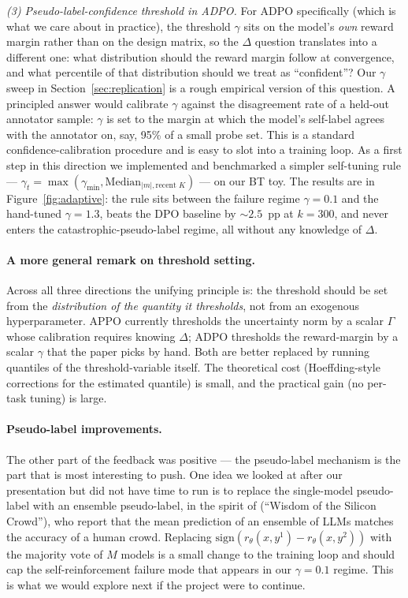\documentclass[11pt]{article}
\begin{document}
\emph{(3) Pseudo-label-confidence threshold in ADPO.} For ADPO specifically (which is what we care about in practice), the threshold $\gamma$ sits on the model's \emph{own} reward margin rather than on the design matrix, so the $\Delta$ question translates into a different one: what distribution should the reward margin follow at convergence, and what percentile of that distribution should we treat as ``confident''? Our $\gamma$ sweep in Section~\ref{sec:replication} is a rough empirical version of this question. A principled answer would calibrate $\gamma$ against the disagreement rate of a held-out annotator sample: $\gamma$ is set to the margin at which the model's self-label agrees with the annotator on, say, 95\% of a small probe set. This is a standard confidence-calibration procedure and is easy to slot into a training loop. As a first step in this direction we implemented and benchmarked a simpler self-tuning rule --- $\gamma_t = \max(\gamma_{\min}, \mathrm{Median}_{|m|, \text{recent } K})$ --- on our BT toy. The results are in Figure~\ref{fig:adaptive}: the rule sits between the failure regime $\gamma = 0.1$ and the hand-tuned $\gamma = 1.3$, beats the DPO baseline by $\sim 2.5$~pp at $k = 300$, and never enters the catastrophic-pseudo-label regime, all without any knowledge of $\Delta$.

\paragraph{A more general remark on threshold setting.}
Across all three directions the unifying principle is: the threshold should be set from the \emph{distribution of the quantity it thresholds}, not from an exogenous hyperparameter. APPO currently thresholds the uncertainty norm by a scalar $\Gamma$ whose calibration requires knowing $\Delta$; ADPO thresholds the reward-margin by a scalar $\gamma$ that the paper picks by hand. Both are better replaced by running quantiles of the threshold-variable itself. The theoretical cost (Hoeffding-style corrections for the estimated quantile) is small, and the practical gain (no per-task tuning) is large.

\paragraph{Pseudo-label improvements.}
The other part of the feedback was positive --- the pseudo-label mechanism is the part that is most interesting to push. One idea we looked at after our presentation but did not have time to run is to replace the single-model pseudo-label with an ensemble pseudo-label, in the spirit of \cite{schoenegger} (``Wisdom of the Silicon Crowd''), who report that the mean prediction of an ensemble of LLMs matches the accuracy of a human crowd. Replacing $\mathrm{sign}(r_\theta(x, y^1) - r_\theta(x, y^2))$ with the majority vote of $M$ models is a small change to the training loop and should cap the self-reinforcement failure mode that appears in our $\gamma = 0.1$ regime. This is what we would explore next if the project were to continue.
\end{document}
